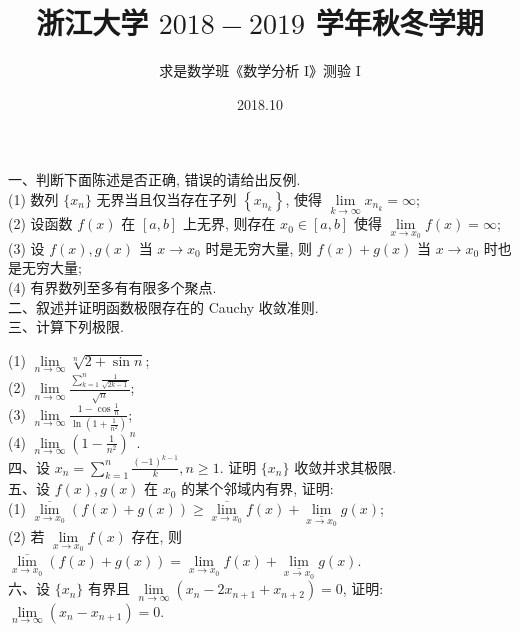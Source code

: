 \documentclass[UTF8]{ctexart}
\title{\textbf{浙江大学 $2018 - 2019$ 学年秋冬学期}}
\author{求是数学班《数学分析 I》测验 I}
\date{2018.10}
\begin{document}
\maketitle
一、判断下面陈述是否正确, 错误的请给出反例.
\\

(1) 数列 $\{x_n\}$ 无界当且仅当存在子列 $\displaystyle\left\{x_{n_k}\right\}$, 使得 $\displaystyle\lim\limits_{k\rightarrow\infty}x_{n_k}=\infty$;
\\

(2) 设函数 $f(x)$ 在 $[a,b]$ 上无界, 则存在 $x_0\in[a,b]$ 使得 $\displaystyle\lim\limits_{x\rightarrow x_0}f(x)=\infty$;
\\

(3) 设 $f(x),g(x)$ 当 $x\rightarrow x_0$ 时是无穷大量, 则 $f(x)+g(x)$ 当 $x\rightarrow x_0$ 时也是无穷大量;
\\

(4) 有界数列至多有有限多个聚点.
\\

二、叙述并证明函数极限存在的 Cauchy 收敛准则.
\\

三、计算下列极限.

(1) $\displaystyle\lim\limits_{n\rightarrow\infty}\sqrt[n]{2+\sin n}$;
\\

(2) $\displaystyle\lim\limits_{n\rightarrow\infty}\frac{\sum\limits_{k=1}^{n}\frac{1}{\sqrt{2k-1}}}{\sqrt{n}}$;
\\

(3) $\displaystyle\lim\limits_{n\rightarrow\infty}\frac{1-\cos\frac{1}{n}}{\ln(1+\frac{1}{n^2})}$;
\\

(4) $\displaystyle\lim\limits_{n\rightarrow\infty}\left(1-\frac{1}{n^2}\right)^n$.
\\

四、设 $\displaystyle x_n=\sum\limits_{k=1}^{n}\frac{(-1)^{k-1}}{k},n\geq1$. 证明 $\{x_n\}$ 收敛并求其极限.
\\

五、设 $f(x),g(x)$ 在 $x_0$ 的某个邻域内有界, 证明:
\\

(1) $\displaystyle\underset{x\rightarrow x_0}{\overline{\lim }}\left(f(x)+g(x)\right)\geq\underset{x\rightarrow x_0}{\overline{\lim }}f(x)+\underset{x\rightarrow x_0}{\underline{\lim }}g(x)$;
\\

(2) 若 $\displaystyle\lim\limits_{x\rightarrow x_0}f(x)$ 存在, 则 $\displaystyle\underset{x\rightarrow x_0}{\overline{\lim }}\left(f(x)+g(x)\right)=\lim\limits_{x\rightarrow x_0}f(x)+\underset{x\rightarrow x_0}{\underline{\lim }}g(x)$.
\\

六、设 $\{x_n\}$ 有界且 $\displaystyle\lim\limits_{n\rightarrow\infty}(x_n-2x_{n+1}+x_{n+2})=0$, 证明: $\displaystyle\lim\limits_{n\rightarrow\infty}(x_n-x_{n+1})=0$.
\end{document}
